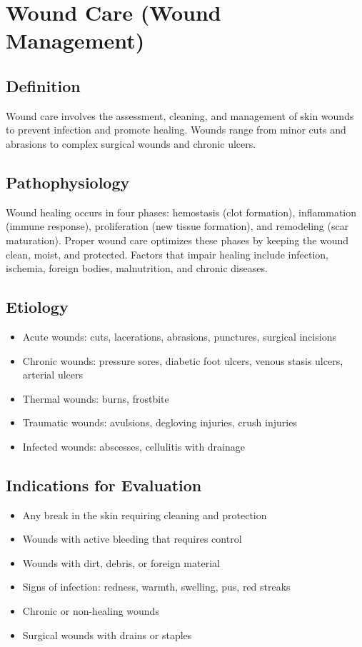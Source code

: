 \chapter{Wound Care (Wound Management)}

\section{Definition}
Wound care involves the assessment, cleaning, and management of skin wounds to prevent infection and promote healing. Wounds range from minor cuts and abrasions to complex surgical wounds and chronic ulcers.

\section{Pathophysiology}
Wound healing occurs in four phases: hemostasis (clot formation), inflammation (immune response), proliferation (new tissue formation), and remodeling (scar maturation). Proper wound care optimizes these phases by keeping the wound clean, moist, and protected. Factors that impair healing include infection, ischemia, foreign bodies, malnutrition, and chronic diseases.

\section{Etiology}
\begin{itemize}
\item Acute wounds: cuts, lacerations, abrasions, punctures, surgical incisions
\item Chronic wounds: pressure sores, diabetic foot ulcers, venous stasis ulcers, arterial ulcers
\item Thermal wounds: burns, frostbite
\item Traumatic wounds: avulsions, degloving injuries, crush injuries
\item Infected wounds: abscesses, cellulitis with drainage
\end{itemize}

\section{Indications for Evaluation}
\begin{itemize}
\item Any break in the skin requiring cleaning and protection
\item Wounds with active bleeding that requires control
\item Wounds with dirt, debris, or foreign material
\item Signs of infection: redness, warmth, swelling, pus, red streaks
\item Chronic or non-healing wounds
\item Surgical wounds with drains or staples
\end{itemize}

